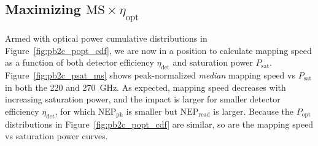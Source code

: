 
\subsection{Maximizing $\mathrm{MS} \times \eta_{\mathrm{opt}}$}
\label{sec:pb2c_psat_maximizing_ms}

Armed with optical power cumulative distributions in Figure~\ref{fig:pb2c_popt_cdf}, we are now in a position to calculate mapping speed as a function of both detector efficiency $\eta_{\mathrm{det}}$ and saturation power $P_{\mathrm{sat}}$. Figure~\ref{fig:pb2c_psat_ms} shows peak-normalized \textit{median} mapping speed vs $P_{\mathrm{sat}}$ in both the 220 and 270~GHz. As expected, mapping speed decreases with increasing saturation power, and the impact is larger for smaller detector efficiency $\eta_{\mathrm{det}}$, for which $\mathrm{NEP_{ph}}$ is smaller but $\mathrm{NEP_{read}}$ is larger. Because the $P_{\mathrm{opt}}$ distributions in Figure~\ref{fig:pb2c_popt_cdf} are similar, so are the mapping speed vs saturation power curves.

